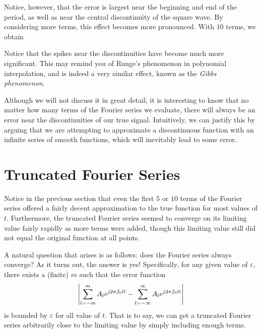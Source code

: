 \documentclass[letterpaper]{article}
\theoremstyle{remark}
\newcommand{\eps}{{\varepsilon}}    %
\begin{document}
Notice, however, that the error is largest near the beginning and end of the period, as well as near the central discontinuity of the square wave. By considering more terms, this effect becomes more pronounced. With $10$ terms, we obtain
\begin{center}
\end{center}
Notice that the spikes near the discontinuities have become much more significant. This may remind you of Runge's phenomenon in polynomial interpolation, and is indeed a very similar effect, known as the \emph{Gibbs phenomenon}. 

Although we will not discuss it in great detail, it is interesting to know that no matter how many terms of the Fourier series we evaluate, there will always be an error near the discontinuities of our true signal. Intuitively, we can justify this by arguing that we are attempting to approximate a discontinuous function with an infinite series of smooth functions, which will inevitably lead to some error.

\section{Truncated Fourier Series}
Notice in the previous section that even the first $5$ or $10$ terms of the Fourier series offered a fairly decent approximation to the true function for most values of $t$. Furthermore, the truncated Fourier series seemed to converge on its limiting value fairly rapidly as more terms were added, though this limiting value still did not equal the original function at all points.

A natural question that arises is as follows: does the Fourier series always converge? As it turns out, the answer is yes! Specifically, for any given value of $\eps$, there exists a (finite) $m$ such that the error function
\[
    \abs{\sum_{l=-m}^m A_l e^{j2\pi f_0 l t} - \sum_{l=-\infty}^\infty A_l e^{j2\pi f_0 l t}}
\]
is bounded by $\eps$ for all value of $t$. That is to say, we can get a truncated Fourier series arbitrarily close to the limiting value by simply including enough terms.
\end{document}
